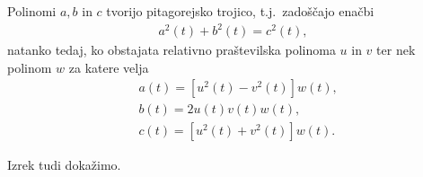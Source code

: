 \documentclass[isrm2, tisk]{fmfdelo}
\begin{document}
    \begin{izrek}              %
        Polinomi $a,b$ in $c$ tvorijo pitagorejsko trojico, t.j.\ zadoščajo enačbi
        \vspace{-0.3cm}
        \begin{align}
            a^2(t)+b^2(t)=c^2(t), \label{eq:abc}
        \end{align}
        natanko tedaj, ko obstajata relativno praštevilska polinoma $u$ in $v$ ter nek polinom  $w$ za katere velja
        \vspace{-0.3cm}
        \begin{align}
            &a(t)=[u^2(t)-v^2(t)]w(t), \nonumber \\
            &b(t)=2u(t)v(t)w(t),        \nonumber \\
            &c(t)=[u^2(t)+v^2(t)]w(t). \label{eq:uvw}
        \end{align}
    \end{izrek}

    Izrek tudi dokažimo.
\end{document}
